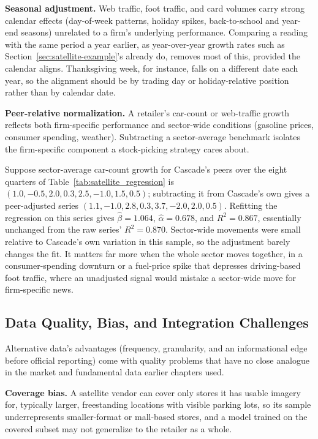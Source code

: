 \documentclass[../ai_in_finance]{subfiles}
\begin{document}
\textbf{Seasonal adjustment.} Web traffic, foot traffic, and card volumes carry strong calendar effects (day-of-week patterns, holiday spikes, back-to-school and year-end seasons) unrelated to a firm's underlying performance. Comparing a reading with the same period a year earlier, as year-over-year growth rates such as Section~\ref{sec:satellite-example}'s already do, removes most of this, provided the calendar aligns. Thanksgiving week, for instance, falls on a different date each year, so the alignment should be by trading day or holiday-relative position rather than by calendar date.

\textbf{Peer-relative normalization.} A retailer's car-count or web-traffic growth reflects both firm-specific performance and sector-wide conditions (gasoline prices, consumer spending, weather). Subtracting a sector-average benchmark isolates the firm-specific component a stock-picking strategy cares about.

Suppose sector-average car-count growth for Cascade's peers over the eight quarters of Table~\ref{tab:satellite_regression} is $(1.0, -0.5, 2.0, 0.3, 2.5, -1.0, 1.5, 0.5)$; subtracting it from Cascade's own gives a peer-adjusted series $(1.1, -1.0, 2.8, 0.3, 3.7, -2.0, 2.0, 0.5)$. Refitting the regression on this series gives $\hat\beta = 1.064$, $\hat\alpha = 0.678$, and $R^2 = 0.867$, essentially unchanged from the raw series' $R^2 = 0.870$. Sector-wide movements were small relative to Cascade's own variation in this sample, so the adjustment barely changes the fit. It matters far more when the whole sector moves together, in a consumer-spending downturn or a fuel-price spike that depresses driving-based foot traffic, where an unadjusted signal would mistake a sector-wide move for firm-specific news.

\subsection{Data Quality, Bias, and Integration Challenges}
\label{sec:alt-data-quality}

Alternative data's advantages (frequency, granularity, and an informational edge before official reporting) come with quality problems that have no close analogue in the market and fundamental data earlier chapters used.

\textbf{Coverage bias.} A satellite vendor can cover only stores it has usable imagery for, typically larger, freestanding locations with visible parking lots, so its sample underrepresents smaller-format or mall-based stores, and a model trained on the covered subset may not generalize to the retailer as a whole.
\end{document}
